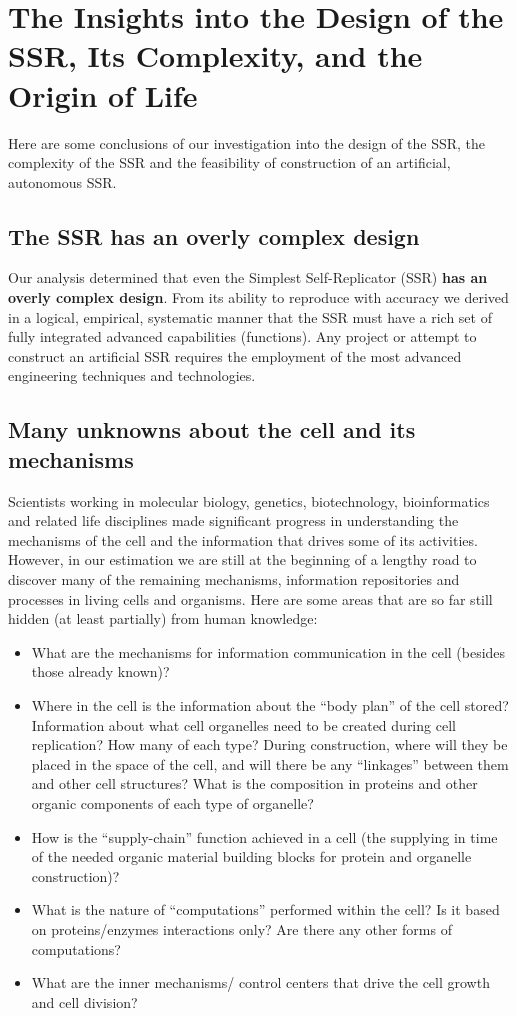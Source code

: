 \section[Insights into the Design]{The Insights into the Design of the SSR, Its Complexity, and the Origin of Life}

Here are some conclusions of our investigation into the design of the
SSR, the complexity of the SSR and the feasibility of construction of
an artificial, autonomous SSR.

\subsection{The SSR has an overly complex design}

Our analysis determined that even the Simplest Self-Replicator (SSR)
\textbf{has an overly complex design}. From its ability to reproduce
with accuracy we derived in a logical, empirical, systematic manner
that the SSR must have a rich set of fully integrated advanced
capabilities (functions).  Any project or attempt to construct an
artificial SSR requires the employment of the most advanced engineering
techniques and technologies.

\subsection{Many unknowns about the cell and its mechanisms}

Scientists working in molecular biology, genetics, biotechnology,
bioinformatics and related life disciplines made significant progress
in understanding the mechanisms of the cell and the information that
drives some of its activities. However, in our estimation we are still
at the beginning of a lengthy road to discover many of the remaining
mechanisms, information repositories and processes in living cells and
organisms. Here are some areas that are so far still hidden (at least
partially) from human knowledge:

\begin{itemize}
\item What are the mechanisms for information communication in the cell
(besides those already known)?
\item Where in the cell is the information about the “body plan” of the
cell stored? Information about what cell organelles need to be created
during cell replication? How many of each type? During construction,
where will they be placed in the space of the cell, and will there be
any “linkages” between them and other cell structures? What is the
composition in proteins and other organic components of each type of
organelle?
\item How is the “supply-chain” function achieved in a cell (the
supplying in time of the needed organic material building blocks for
protein and organelle construction)?
\item What is the nature of “computations” performed within the cell? Is
it based on proteins/enzymes interactions only? Are there any other
forms of computations?
\item What are the inner mechanisms/ control centers that drive the cell
growth and cell division?
\end{itemize}

